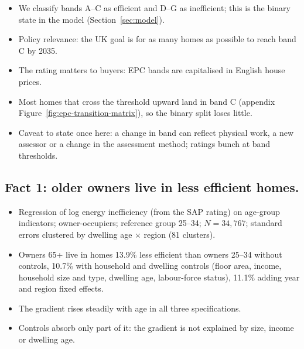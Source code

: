 \begin{itemize}
  \item We classify bands A--C as efficient and D--G as inefficient; this is
    the binary state in the model (Section~\ref{sec:model}).
  \item Policy relevance: the UK goal is for as many homes as possible to
    reach band C by 2035.
  \item The rating matters to buyers: EPC bands are capitalised in English
    house prices. 
  \item Most homes that cross the threshold upward land in band C (appendix
    Figure~\ref{fig:epc-transition-matrix}), so the binary split loses
    little.
  \item Caveat to state once here: a change in band can reflect physical
    work, a new assessor or a change in the assessment method; ratings
    bunch at band thresholds. 
\end{itemize}

\subsection{Fact 1: older owners live in less efficient homes.}

\begin{itemize}
  \item Regression of log energy inefficiency (from the SAP rating) on
    age-group indicators; owner-occupiers; reference group 25--34;
    $N = 34{,}767$; standard errors clustered by dwelling age $\times$ region
    (81 clusters).
  \item Owners 65+ live in homes 13.9\% less efficient than owners 25--34
    without controls, 10.7\% with household and dwelling controls (floor
    area, income, household size and type, dwelling age, labour-force
    status), 11.1\% adding year and region fixed effects.
  \item The gradient rises steadily with age in all three specifications.
  \item Controls absorb only part of it: the gradient is not explained by
    size, income or dwelling age.
\end{itemize}

